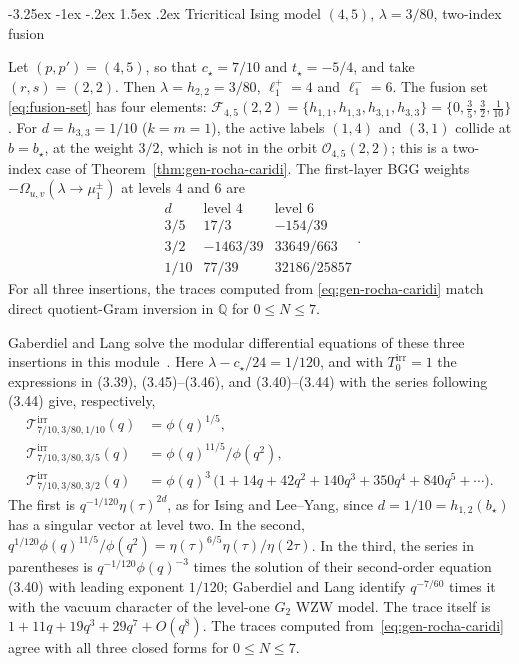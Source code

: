 \documentclass[twoside,10pt]{article}
\makeatletter
\numberwithin{equation}{section}
\theoremstyle{slbody}
\theoremstyle{definition}
\theoremstyle{remark}
\renewcommand{\subsection}{%
  \@startsection{subsection}{2}{\z@}%
    {-3.25ex \@plus -1ex \@minus -.2ex}%
    {1.5ex \@plus .2ex}%
    {\normalfont\normalsize\bfseries}}
\makeatother
\begin{document}
\subsection{Tricritical Ising model \texorpdfstring{\((4,5)\), \(\lambda=3/80\)}{(4,5), lambda=3/80}, two-index fusion}

Let \((p,p')=(4,5)\), so that \(c_\star=7/10\) and \(t_\star=-5/4\), and take
\((r,s)=(2,2)\).  Then \(\lambda=h_{2,2}=3/80\), \(\ell^+_1=4\) and
\(\ell^-_1=6\).  The fusion set \eqref{eq:fusion-set} has four elements:
\(\mathcal{F}_{4,5}(2,2)=\{h_{1,1},h_{1,3},h_{3,1},h_{3,3}\}=\{0,\frac{3}{5},\frac{3}{2},\frac{1}{10}\}\).
For \(d=h_{3,3}=1/10\) (\(k=m=1\)), the active labels \((1,4)\) and \((3,1)\)
collide at \(b=b_\star\), at the weight \(3/2\), which is not in the orbit
\(\mathcal{O}_{4,5}(2,2)\); this is a two-index case of
Theorem~\ref{thm:gen-rocha-caridi}.  The first-layer BGG weights
\(-\Omega_{u,v}(\lambda\to\mu^\pm_1)\) at levels \(4\) and \(6\) are
\[
 \begin{array}{c|rr}
  d & \text{level }4 & \text{level }6\\\hline
  3/5 & 17/3 & -154/39\\
  3/2 & -1463/39 & 33649/663\\
  1/10 & 77/39 & 32186/25857
 \end{array}.
\]
For all three insertions, the traces
computed from \eqref{eq:gen-rocha-caridi} match direct quotient-Gram inversion
in \(\mathbb{Q}\) for \(0\leq N\leq 7\).

Gaberdiel and Lang solve the modular differential equations of these three
insertions in this module~\cite[\S3.4, (3.38)--(3.48)]{GaberdielLang2009}.
Here \(\lambda-c_\star/24=1/120\), and with \(T^{\mathrm{irr}}_0=1\) the
expressions in (3.39), (3.45)--(3.46), and (3.40)--(3.44) with the series
following (3.44) give, respectively,
\[
 \begin{aligned}
 \mathcal{T}^{\mathrm{irr}}_{7/10,3/80,1/10}(q)&=\phi(q)^{1/5},\\
 \mathcal{T}^{\mathrm{irr}}_{7/10,3/80,3/5}(q)&=\phi(q)^{11/5}/\phi(q^2),\\
 \mathcal{T}^{\mathrm{irr}}_{7/10,3/80,3/2}(q)&=\phi(q)^3\,
  \bigl(1+14q+42q^2+140q^3+350q^4+840q^5+\cdots\bigr).
 \end{aligned}
\]
The first is \(q^{-1/120}\eta(\tau)^{2d}\), as for Ising and Lee--Yang, since
\(d=1/10=h_{1,2}(b_\star)\) has a singular vector at level two.  In the
second, \(q^{1/120}\phi(q)^{11/5}/\phi(q^2)=\eta(\tau)^{6/5}\eta(\tau)/\eta(2\tau)\).
In the third, the series in parentheses is \(q^{-1/120}\phi(q)^{-3}\) times
the solution of their second-order equation (3.40) with leading exponent
\(1/120\); Gaberdiel and Lang identify \(q^{-7/60}\) times it with the
vacuum character of the level-one \(G_2\) WZW model.  The trace itself is
\(1+11q+19q^3+29q^7+O(q^8)\).  The traces computed
from~\eqref{eq:gen-rocha-caridi} agree with all three closed forms for
\(0\leq N\leq 7\).
\end{document}
